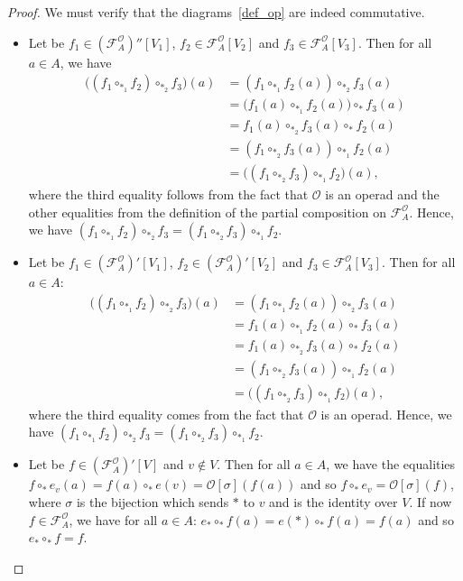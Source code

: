 \documentclass[11pt]{article}
\theoremstyle{definition}
\numberwithin{equation}{section}
\newcommand{\comp}[1][\ast]{\circ_{#1}}
\newcommand{\func}[2]{\mathcal{F}_{#1}^{#2}}
\newcommand{\Operad}{\mathcal{O}}
\begin{document}
\begin{proof}
    We must verify that the diagrams~\eqref{def_op} are indeed commutative.
    \begin{itemize}
        \item Let be $f_1\in(\func{A}{\Operad})''[V_1]$, $f_2\in\func{A}{\Operad}[V_2]$ and 
        $f_3\in\func{A}{\Operad}[V_3]$. Then for all $a\in A$, we have
        \begin{equation}\begin{split}
            \big((f_1\comp[\ast_1] f_2)\comp[\ast_2] f_3\big)(a) &= (f_1\comp[\ast_1] f_2(a))\comp[\ast_2] f_3(a) \\
            &= \big(f_1(a)\comp[\ast_1] f_2(a)\big)\comp f_3(a) \\
            &= f_1(a)\comp[\ast_2] f_3(a)\comp f_2(a) \\
            &= (f_1\comp[\ast_2] f_3(a))\comp[\ast_1] f_2(a) \\
            &= \big((f_1\comp[\ast_2] f_3)\comp[\ast_1] f_2\big)(a),
        \end{split}\end{equation}
        where the third equality follows from the fact that $\Operad$ is an operad and the other equalities 
        from the definition of the partial composition on $\func{A}{\Operad}$. Hence, we have 
        $(f_1\comp[\ast_1]f_2)\comp[\ast_2] f_3 = (f_1\comp[\ast_2]f_3)\comp[\ast_1]f_2$.
        
        \item Let be $f_1\in(\func{A}{\Operad})'[V_1]$, $f_2\in(\func{A}{\Operad})'[V_2]$ and 
        $f_3\in\func{A}{\Operad}[V_3]$. Then for all $a\in A$:
        \begin{equation}\begin{split}
            \big((f_1\comp[\ast_1] f_2)\comp[\ast_2] f_3\big)(a) &= (f_1\comp[\ast_1] f_2(a))\comp[\ast_2] f_3(a) \\
            &= f_1(a)\comp[\ast_1] f_2(a)\comp f_3(a) \\
            &= f_1(a)\comp[\ast_2] f_3(a)\comp f_2(a) \\
            &= (f_1\comp[\ast_2] f_3(a))\comp[\ast_1] f_2(a) \\
            &= \big((f_1\comp[\ast_2] f_3)\comp[\ast_1] f_2\big)(a),
        \end{split}\end{equation}
        where the third equality comes from the fact that $\Operad$ is an operad. Hence, we have 
        $(f_1\comp[\ast_1]f_2)\comp[\ast_2] f_3 = (f_1\comp[\ast_2] f_3)\comp[\ast_1] f_2$.
        
        \item Let be $f\in(\func{A}{\Operad})'[V]$ and $v\not\in V$. Then for all $a\in A$, we have 
        the equalities $f\comp e_v(a)= f(a)\comp e(v) = \Operad[\sigma](f(a))$ and so 
        $f\comp e_v=\Operad[\sigma](f)$, where $\sigma$ is the bijection which sends $\ast$ to $v$ and is 
        the identity over $V$. If now $f\in\func{A}{\Operad}$, we have for all 
        $a\in A$: $e_{\ast}\comp f(a)= e(\ast)\comp f(a) = f(a)$ and so $e_{\ast}\comp f = f$. \qedhere
    \end{itemize}
\end{proof}
\end{document}
